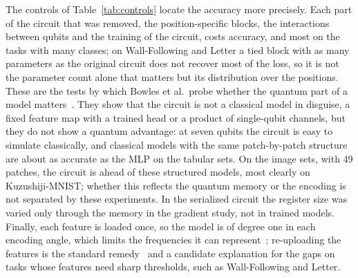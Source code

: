 \documentclass[11pt]{article}
\begin{document}
The controls of Table~\ref{tab:controls} locate the accuracy more precisely. Each part of the circuit that was removed, the position-specific blocks, the interactions between qubits and the training of the circuit, costs accuracy, and most on the tasks with many classes; on Wall-Following and Letter a tied block with as many parameters as the original circuit does not recover most of the loss, so it is not the parameter count alone that matters but its distribution over the positions. These are the tests by which Bowles et al.\ probe whether the quantum part of a model matters~\cite{bowles2024better}. They show that the circuit is not a classical model in disguise, a fixed feature map with a trained head or a product of single-qubit channels, but they do not show a quantum advantage: at seven qubits the circuit is easy to simulate classically, and classical models with the same patch-by-patch structure are about as accurate as the MLP on the tabular sets. On the image sets, with 49 patches, the circuit is ahead of these structured models, most clearly on Kuzushiji-MNIST; whether this reflects the quantum memory or the encoding is not separated by these experiments. In the serialized circuit the register size was varied only through the memory in the gradient study, not in trained models. Finally, each feature is loaded once, so the model is of degree one in each encoding angle, which limits the frequencies it can represent~\cite{schuld2021effect}; re-uploading the features is the standard remedy~\cite{perezsalinas2020reuploading} and a candidate explanation for the gaps on tasks whose features need sharp thresholds, such as Wall-Following and Letter.
\end{document}
